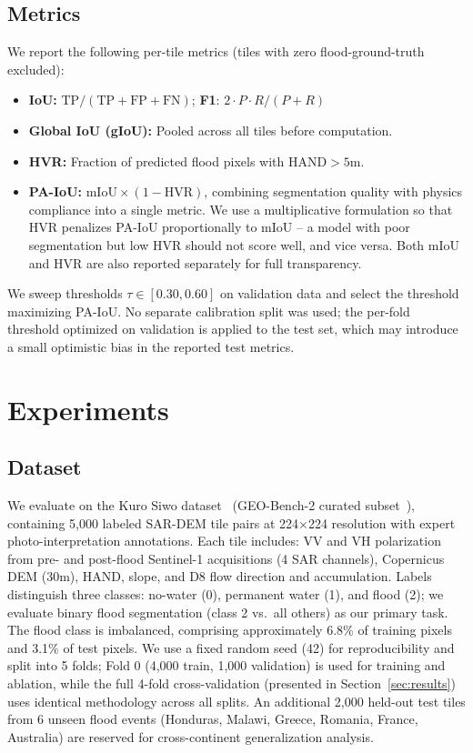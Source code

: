 \documentclass[journal]{IEEEtran}
\begin{document}
\subsection{Metrics}
We report the following per-tile metrics (tiles with zero flood-ground-truth excluded):
\begin{itemize}
    \item \textbf{IoU:} $\text{TP}/(\text{TP}+\text{FP}+\text{FN})$; \textbf{F1}: $2 \cdot P \cdot R / (P + R)$
    \item \textbf{Global IoU (gIoU):} Pooled across all tiles before computation.
    \item \textbf{HVR:} Fraction of predicted flood pixels with $\text{HAND} > 5\text{m}$.
    \item \textbf{PA-IoU:} $\text{mIoU} \times (1 - \text{HVR})$, combining segmentation quality with physics compliance into a single metric. We use a multiplicative formulation so that HVR penalizes PA-IoU proportionally to mIoU -- a model with poor segmentation but low HVR should not score well, and vice versa. Both mIoU and HVR are also reported separately for full transparency.
\end{itemize}
We sweep thresholds $\tau \in [0.30, 0.60]$ on validation data and select the threshold maximizing PA-IoU. No separate calibration split was used; the per-fold threshold optimized on validation is applied to the test set, which may introduce a small optimistic bias in the reported test metrics.

\section{Experiments}

\subsection{Dataset}
We evaluate on the Kuro Siwo dataset~\cite{kuro_siwo} (GEO-Bench-2 curated subset~\cite{geobench2}), containing 5,000 labeled SAR-DEM tile pairs at 224$\times$224 resolution with expert photo-interpretation annotations. Each tile includes: VV and VH polarization from pre- and post-flood Sentinel-1 acquisitions (4 SAR channels), Copernicus DEM (30m), HAND, slope, and D8 flow direction and accumulation. Labels distinguish three classes: no-water (0), permanent water (1), and flood (2); we evaluate binary flood segmentation (class 2 vs.\ all others) as our primary task. The flood class is imbalanced, comprising approximately 6.8\% of training pixels and 3.1\% of test pixels. We use a fixed random seed (42) for reproducibility and split into 5 folds; Fold 0 (4,000 train, 1,000 validation) is used for training and ablation, while the full 4-fold cross-validation (presented in Section~\ref{sec:results}) uses identical methodology across all splits. An additional 2,000 held-out test tiles from 6 unseen flood events (Honduras, Malawi, Greece, Romania, France, Australia) are reserved for cross-continent generalization analysis.
\end{document}
